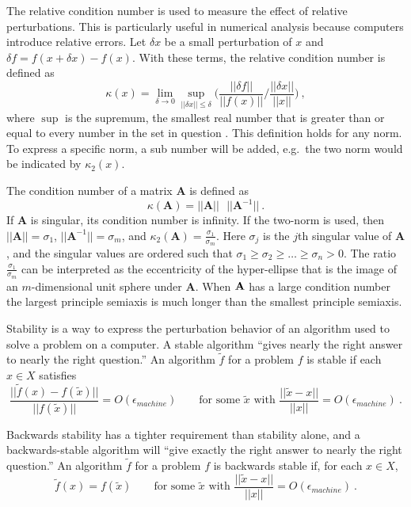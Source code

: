 The relative condition number is used to measure the effect of relative perturbations. This is particularly useful in numerical analysis because computers introduce relative errors. Let $\delta x$ be a small perturbation of $x$ and $\delta f = f(x + \delta x) - f(x)$. With these terms, the relative condition number is defined as
%
\begin{equation}
  \kappa(x) = \lim_{\delta \rightarrow 0} \sup_{||\delta x|| \le \delta} \biggl(\frac{||\delta f||}{||f(x)||} / \frac{||\delta x||}{||x||} \biggr)  \:,
  \label{eq:cond}
\end{equation}
%
where $\sup$ is the supremum, the smallest real number that is greater than or equal to every number in the set in question \cite{Wikipedia2011}. This definition holds for any norm. To express a specific norm, a sub number will be added, e.g.\ the two norm would be indicated by $\kappa_{2}(x)$.

The condition number of a matrix $\mathbf{A}$ is defined as
%
\begin{equation}
  \kappa(\mathbf{A}) = ||\mathbf{A}|| \text{ }||\mathbf{A}^{-1}|| \:.
  \label{eq:condA}
\end{equation}
%
If $\mathbf{A}$ is singular, its condition number is infinity. If the two-norm is used, then $||\mathbf{A}|| = \sigma_{1}$, $||\mathbf{A}^{-1}|| = \sigma_{m}$, and $\kappa_{2}(\mathbf{A}) = \frac{\sigma_{1}}{\sigma_{m}}$. Here $\sigma_{j}$ is the $j$th singular value of $\mathbf{A}$, and the singular values are ordered such that $\sigma_{1} \ge \sigma_{2} \ge \dots \ge \sigma_{n} > 0$. The ratio $\frac{\sigma_{1}}{\sigma_{m}}$ can be interpreted as the eccentricity of the hyper-ellipse that is the image of an $m$-dimensional unit sphere under $\mathbf{A}$. When $\mathbf{A}$ has a large condition number the largest principle semiaxis is much longer than the smallest principle semiaxis. 

Stability is a way to express the perturbation behavior of an algorithm used to solve a problem on a computer. A stable algorithm ``gives nearly the right answer to nearly the right question.'' An algorithm $\tilde f$ for a problem $f$ is stable if each $x \in X$ satisfies
\begin{equation}
  \frac{||\tilde f(x) - f(\tilde x)||}{||f(\tilde x)||} = O(\epsilon_{machine}) \qquad \text{for some } \tilde{x} \text{ with } \frac{||\tilde x - x||}{||x||} = O(\epsilon_{machine}) \:.
  \label{eq:stable}
\end{equation}

Backwards stability has a tighter requirement than stability alone, and a backwards-stable algorithm will ``give exactly the right answer to nearly the right question.'' An algorithm $\tilde{f}$ for a problem $f$ is backwards stable if, for each $x \in X$,
%
\begin{equation}
  \tilde{f}(x) = f(\tilde{x}) \qquad \text{for some } \tilde{x} \text{ with } \frac{||\tilde{x} - x||}{||x||} = O(\epsilon _{machine}) \:.
  \label{eq:back stable}
\end{equation}

